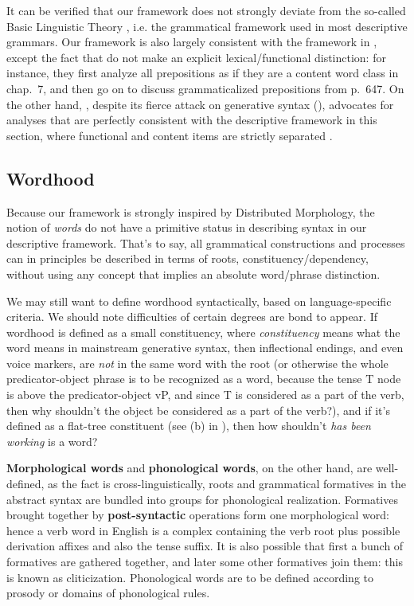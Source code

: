 \documentclass[UTF8, a4paper, oneside, scheme=plain, 12pt]{ctexrep}
\newcommand*{\citechap}[1]{chap.~{#1}}
\newcommand*{\citepage}[1]{p.~{#1}}
\newcommand*{\concept}[1]{\textbf{#1}}
\newcommand*{\term}[1]{\emph{#1}}
\newcommand{\form}[1]{\emph{#1}}
\begin{document}
{It can be verified that our framework does not strongly deviate from the so-called Basic Linguistic Theory
\citep{dixon2009basic},
i.e. the grammatical framework used in most descriptive grammars.
Our framework is also largely consistent with the framework in \citet{cgel},
except the fact that \citet{cgel} do not make an explicit lexical/functional distinction:
for instance, they first analyze all prepositions as if they are a content word class
in \citechap{7},
and then go on to discuss grammaticalized prepositions from \citepage{647}.
On the other hand, \citet{dixon2009basic}, despite its fierce attack on generative syntax
(),
advocates for analyses that are perfectly consistent with the descriptive framework in this section,
where functional and content items are strictly separated
\citep[\citepage{49}]{dixon2009basic}.

\subsection{Wordhood}\label{sec:intro.theory.word}

Because our framework is strongly inspired by Distributed Morphology,
the notion of \term{words} do not have a primitive status
in describing syntax in our descriptive framework.
That's to say, all grammatical constructions and processes
can in principles be described in terms of roots, constituency/dependency,
without using any concept that implies an absolute word/phrase distinction.

We may still want to define wordhood syntactically,
based on language-specific criteria.
We should note difficulties of certain degrees are bond to appear.
If wordhood is defined as a small constituency, where \term{constituency} means what the word means in mainstream generative syntax,
then inflectional endings, and even voice markers,
are \emph{not} in the same word with the root
(or otherwise the whole predicator-object phrase is to be recognized as a word,
because the tense T node is above the predicator-object vP,
and since T is considered as a part of the verb,
then why shouldn't the object be considered as a part of the verb?),
and if it's defined as a flat-tree constituent (see (b) in ),
then how shouldn't \form{has been working} is a word?

\concept{Morphological words} and \concept{phonological words},
on the other hand, are well-defined, as the fact is cross-linguistically,
roots and grammatical formatives in the abstract syntax are bundled into groups for phonological realization.
Formatives brought together by \concept{post-syntactic} operations form one morphological word:
hence a verb word in English is a complex containing
the verb root plus possible derivation affixes and also the tense suffix.
It is also possible that first a bunch of formatives are gathered together,
and later some other formatives join them:
this is known as cliticization.
Phonological words are to be defined according to prosody
or domains of phonological rules.

}
\end{document}
